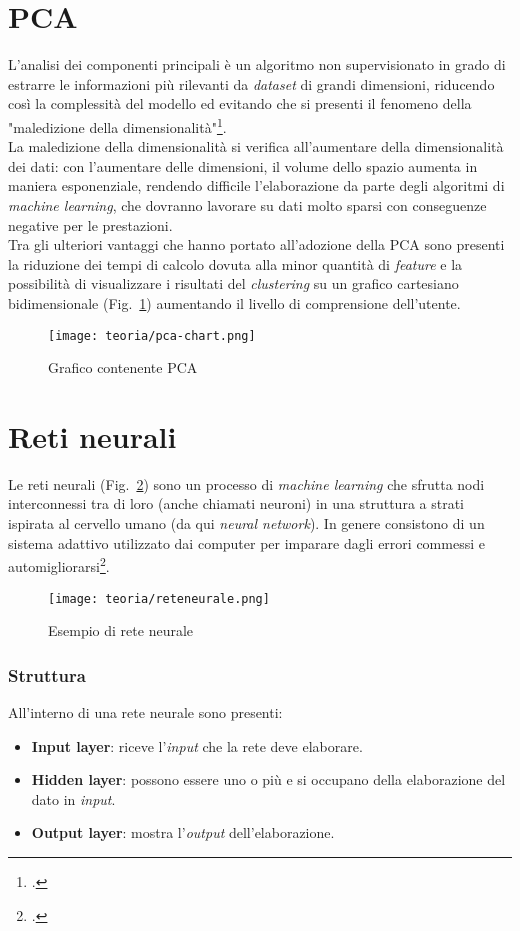 \section{PCA}
L'analisi dei componenti principali è un algoritmo non supervisionato in grado di estrarre le informazioni più rilevanti da \emph{\gls{dataset}} di grandi dimensioni, riducendo così la complessità del modello ed evitando che si presenti il fenomeno della "maledizione della dimensionalità"\footcite{site:PCA}.\\La maledizione della dimensionalità si verifica all'aumentare della dimensionalità dei dati: con l'aumentare delle dimensioni, il volume dello spazio aumenta in maniera esponenziale, rendendo difficile l'elaborazione da parte degli algoritmi di \emph{machine learning}, che dovranno lavorare su dati molto sparsi con conseguenze negative per le prestazioni.\\Tra gli ulteriori vantaggi che hanno portato all'adozione della PCA sono presenti la riduzione dei tempi di calcolo dovuta alla minor quantità di \emph{\gls{feature}} e la possibilità di visualizzare i risultati del \emph{clustering} su un grafico cartesiano bidimensionale (Fig.~\ref{fig:pca-chart}) aumentando il livello di comprensione dell'utente.

\begin{figure}[!h] 
    \centering 
    \texttt{[image: teoria/pca-chart.png]} 
    \caption{Grafico contenente PCA}
    \label{fig:pca-chart}
  \end{figure}

\newpage

\section{Reti neurali}
Le reti neurali (Fig.~\ref{fig:rete-neurale}) sono un processo di \emph{machine learning} che sfrutta nodi interconnessi tra di loro (anche chiamati neuroni) in una struttura a strati ispirata al cervello umano (da qui \emph{neural network}).
In genere consistono di un sistema adattivo utilizzato dai computer per imparare dagli errori commessi e automigliorarsi\footcite{site:rete-neurale}.

\begin{figure}[!h] 
    \centering 
    \texttt{[image: teoria/reteneurale.png]} 
    \caption{Esempio di rete neurale}
    \label{fig:rete-neurale}
  \end{figure}

\subsubsection{Struttura}
All'interno di una rete neurale sono presenti:
\begin{itemize}
    \item \textbf{Input layer}: riceve l'\emph{input} che la rete deve elaborare.
    \item \textbf{Hidden layer}: possono essere uno o più e si occupano della elaborazione del dato in \emph{input}.
    \item \textbf{Output layer}: mostra l'\emph{output} dell'elaborazione.
\end{itemize}

